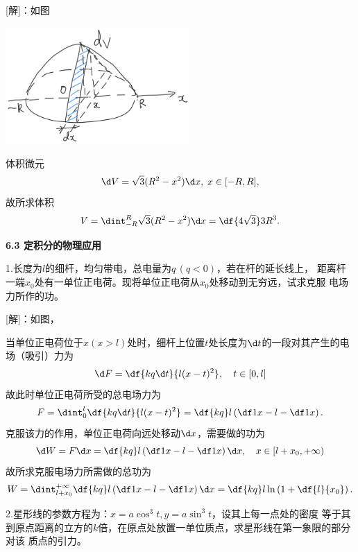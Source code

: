 [解]：如图
\begin{center}
	\includegraphics[width=7cm]{./images/ch6/rtSp.jpg}
\end{center}
体积微元
$$\d V=\sqrt3(R^2-x^2)\d x,\;x\in[-R,R],$$
故所求体积
$$V=\dint_{-R}^R\sqrt3(R^2-x^2)\d x=\df{4\sqrt3}3R^3.$$
\fin

\begin{center}
	{\bf 6.3 定积分的物理应用}
\end{center}

\bs

1.长度为$l$的细杆，均匀带电，总电量为$q\,(q<0)$，若在杆的延长线上，
距离杆一端$x_0$处有一单位正电荷。现将单位正电荷从$x_0$处移动到无穷远，试求克服
电场力所作的功。

[解]：如图，
\begin{center}
\end{center}
当单位正电荷位于$x(x>l)$处时，细杆上位置$t$处长度为$\d t$的一段对其产生的电场（吸引）力为
$$\d F=\df{kq\d t}{l(x-t)^2},\quad t\in[0,l]$$
故此时单位正电荷所受的总电场力为
$$F=\dint_0^l\df{kq\d t}{l(x-t)^2}=\df{kq}l\left(\df1{x-l}-\df1x\right).$$
克服该力的作用，单位正电荷向远处移动$\d x$，需要做的功为
$$\d W=F\d x=\df{kq}l\left(\df1{x-l}-\df1x\right)\d x,
\quad x\in[l+x_0,+\infty)$$
故所求克服电场力所需做的总功为
$$W=\dint_{l+x_0}^{+\infty}\df{kq}l\left(\df1{x-l}-\df1x\right)\d x
=\df{kq}l\ln\left(1+\df{l}{x_0}\right).$$
\fin

\bs

2.星形线的参数方程为：$x=a\cos^3t,y=a\sin^3t$，设其上每一点处的密度
等于其到原点距离的立方的$k$倍，在原点处放置一单位质点，求星形线在第一象限的部分对该
质点的引力。

